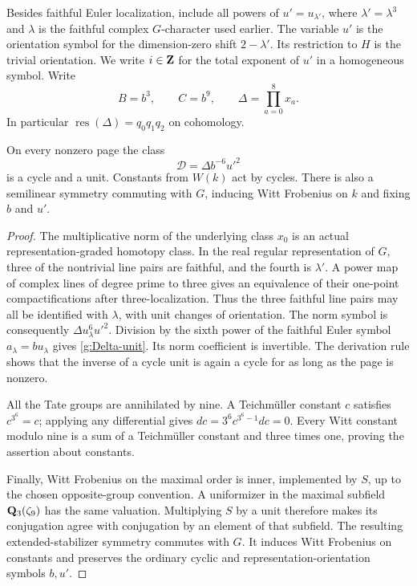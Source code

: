 Besides faithful Euler localization, include all powers of
$u'=u_{\lambda'}$, where $\lambda'=\lambda^3$ and $\lambda$ is the
faithful complex $G$-character used earlier.  The variable $u'$ is the
orientation symbol for the dimension-zero shift $2-\lambda'$.
Its restriction to $H$ is the trivial orientation.  We write $i\in\mathbf Z$ for
the total exponent of $u'$ in a homogeneous symbol.  Write
\[
 B=b^3,\qquad C=b^9,\qquad
 \Delta=\prod_{a=0}^8x_a.
\]
In particular $\operatorname{res}(\Delta)=q_0q_1q_2$ on cohomology.

\begin{lemma}\label{g:translations}
On every nonzero page the class
\begin{equation}\label{g:Delta-unit}
 \mathcal D=\Delta b^{-6}u'^2
\end{equation}
is a cycle and a unit.  Constants from $W(k)$ act by cycles.  There is
also a semilinear symmetry commuting with $G$, inducing Witt
Frobenius on $k$ and fixing $b$ and $u'$.
\end{lemma}

\begin{proof}
The multiplicative norm of the underlying class $x_0$ is an actual
representation-graded homotopy class.  In the real regular
representation of $G$, three of the nontrivial line pairs are
faithful, and the fourth is $\lambda'$.  A power map of complex lines
of degree prime to three gives an equivalence of their one-point
compactifications after three-localization.  Thus the three faithful
line pairs may all be identified with $\lambda$, with unit changes
of orientation.  The norm symbol is consequently
$\Delta u_\lambda^6u'^2$.  Division by the sixth power of the
faithful Euler symbol $a_\lambda=bu_\lambda$ gives
\eqref{g:Delta-unit}.  Its norm coefficient is invertible.  The
derivation rule shows that the inverse of a cycle unit is again a
cycle for as long as the page is nonzero.

All the Tate groups are annihilated by nine.  A Teichm\"uller
constant $c$ satisfies $c^{3^6}=c$; applying any differential gives
$dc=3^6c^{3^6-1}dc=0$.  Every Witt constant modulo nine is a sum of
a Teichm\"uller constant and three times one, proving the assertion
about constants.

Finally, Witt Frobenius on the maximal order is inner, implemented
by $S$, up to the chosen opposite-group convention.  A uniformizer
in the maximal subfield $\mathbf Q_3(\zeta_9)$ has the same valuation.
Multiplying $S$ by a unit therefore makes its conjugation agree
with conjugation by an element of that subfield.  The resulting
extended-stabilizer symmetry commutes with $G$.  It induces Witt
Frobenius on constants and preserves the ordinary cyclic and
representation-orientation symbols $b,u'$.
\end{proof}


